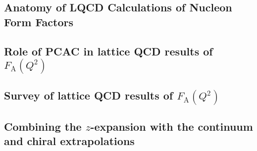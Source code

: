 



%

\subsection{Anatomy of LQCD Calculations of Nucleon Form Factors\label{sec:calc_anatomy}}


\subsection{Role of PCAC in lattice QCD results of $F_{\mathrm{A}}(Q^2)$\label{sec:lqcd_pcac}}


\subsection{Survey of lattice QCD results of $F_{\mathrm{A}}(Q^2)$\label{sec:lqcd_results}}


\subsection{Combining the $z$-expansion with the continuum and chiral extrapolations\label{sec:z_continuum}}

